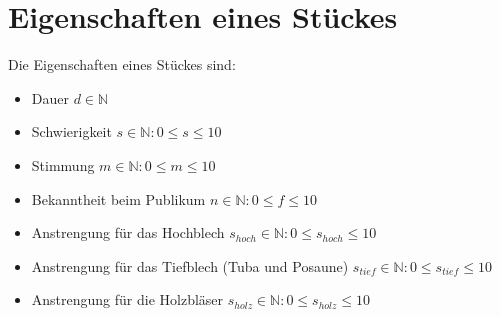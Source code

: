 \section{Eigenschaften eines Stückes}\label{sec:settings}
Die Eigenschaften eines Stückes sind:
\begin{itemize}
    \item Dauer $d \in \mathbb{N}$
    \item Schwierigkeit $ s \in \mathbb{N}: 0 \leq s \leq 10$
    \item Stimmung $ m \in \mathbb{N}: 0 \leq m \leq 10$
    \item Bekanntheit beim Publikum $ n \in \mathbb{N}: 0 \leq f \leq 10$
    \item Anstrengung für das Hochblech $ s_{hoch} \in \mathbb{N}: 0 \leq s_{hoch}  \leq 10$
    \item Anstrengung für das Tiefblech (Tuba und Posaune) $ s_{tief} \in \mathbb{N}: 0 \leq s_{tief} \leq 10$
    \item Anstrengung für die Holzbläser $ s_{holz} \in \mathbb{N}: 0 \leq s_{holz} \leq 10$
\end{itemize}